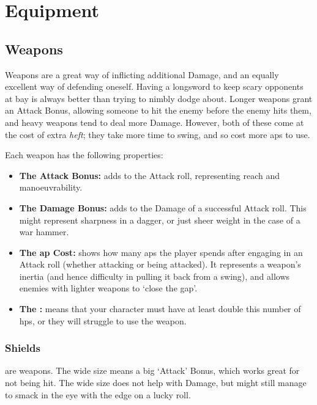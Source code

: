 
\section{Equipment}

\begin{multicols}{2}

\subsection{Weapons}

\noindent
Weapons are a great way of inflicting additional Damage, and an equally excellent way of defending oneself.
Having a longsword to keep scary opponents at bay is always better than trying to nimbly dodge about.
Longer weapons grant an Attack Bonus, allowing someone to hit the enemy before the enemy hits them, and heavy weapons tend to deal more Damage.
However, both of these come at the cost of extra \emph{heft}; they take more time to swing, and so cost more \glspl{ap} to use.

Each weapon has the following properties:

\begin{itemize}

  \item
  \textbf{The Attack Bonus:} adds to the Attack roll, representing reach and manoeuvrability.
  \item
  \textbf{The Damage Bonus:} adds to the Damage of a successful Attack roll.
  This might represent sharpness in a dagger, or just sheer weight in the case of a war hammer.
  \item
  \textbf{The \Gls{ap} Cost:} shows how many \glspl{ap} the player spends after engaging in an Attack roll (whether attacking or being attacked).
  It represents a weapon's inertia (and hence difficulty in pulling it back from a swing), and allows enemies with lighter weapons to `close the gap'.
  \item
  \textbf{The :} means that your character must have at least double this number of \glspl{hp}, or they will struggle to use the weapon.
\end{itemize}

\weaponsChart
\label{weaponschart}

\subsubsection{Shields}
\label{shields}
are weapons.
The wide size means a big `Attack' Bonus, which works great for not being hit.
The wide size does not help with Damage, but  might still manage to smack  in the eye with the edge on a lucky roll.


\end{multicols}
